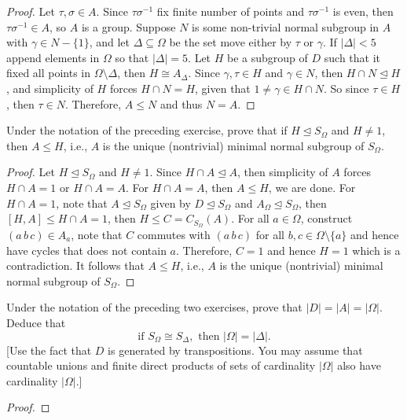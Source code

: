 \documentclass{article}
\newenvironment{problem}[2][Problem]{\begin{trivlist}
\item[\hskip \labelsep {\bfseries #1}\hskip \labelsep {\bfseries #2.}]}{\end{trivlist}}
\begin{document}
\begin{proof}
    Let $\tau, \sigma \in A$. Since $\tau\sigma^{-1}$ fix finite number of points and $\tau \sigma^{-1}$ is even, then $\tau\sigma^{-1}\in A$, so $A$ is a group. Suppose $N$ is some non-trivial normal subgroup in $A$ with $\gamma\in N-\{1\}$, and let $\Delta\subseteq \Omega$ be the set move either by $\tau$ or $\gamma$. If $|\Delta|<5$ append elements in $\Omega$ so that $|\Delta|=5$. Let $H$ be a subgroup of $D$ such that it fixed all points in $\Omega\setminus \Delta$, then $H\cong A_{\Delta}$. Since $\gamma, \tau\in H$ and $\gamma\in N$, then $H\cap N \trianglelefteq H$, and simplicity of $H$ forces $H\cap N = H$, given that $1\neq \gamma\in H\cap N$. So since $\tau \in H$, then $\tau \in N$. Therefore, $A\leq N$ and thus $N=A$.
\end{proof}
\begin{problem}{7}
     Under the notation of the preceding exercise, prove that if $H \trianglelefteq S_\Omega$ and $H \neq 1$, then $A \leq H$, i.e., $A$ is the unique (nontrivial) minimal normal subgroup of $S_\Omega$.
\end{problem}
\begin{proof}
    Let $H\trianglelefteq S_{\Omega}$ and $H\neq 1$. Since $H\cap A\trianglelefteq A$, then simplicity of $A$ forces $H\cap A=1$ or $H\cap A=A$. For $H\cap A=A$, then $A\leq H$, we are done. For $H\cap A=1$, note that $A\trianglelefteq S_{\Omega}$ given by $D\trianglelefteq S_{\Omega}$ and $A_{\Omega}\trianglelefteq S_{\Omega}$, then $[H, A]\leq H\cap A =1$, then $H\leq C=C_{S_{\Omega}}(A)$. For all $a \in \Omega$, construct $(a\, b\, c)\in A_a$, note that $C$ commutes with $(a\, b\, c)$ for all $b, c\in \Omega\setminus \{a\}$ and hence have cycles that does not contain $a$. Therefore, $C=1$ and hence $H=1$ which is a contradiction. It follows that $A \leq H$, i.e., $A$ is the unique (nontrivial) minimal normal subgroup of $S_\Omega$.
\end{proof}
\begin{problem}{8}
    Under the notation of the preceding two exercises, prove that $|D| = |A| = |\Omega|$. Deduce that 
    \[
    \text{if } S_\Omega \cong S_\Delta, \text{ then } |\Omega| = |\Delta|.
    \]
    [Use the fact that $D$ is generated by transpositions. You may assume that countable unions and finite direct products of sets of cardinality $|\Omega|$ also have cardinality $|\Omega|$.]
\end{problem}
\begin{proof}
    
\end{proof}
\end{document}
